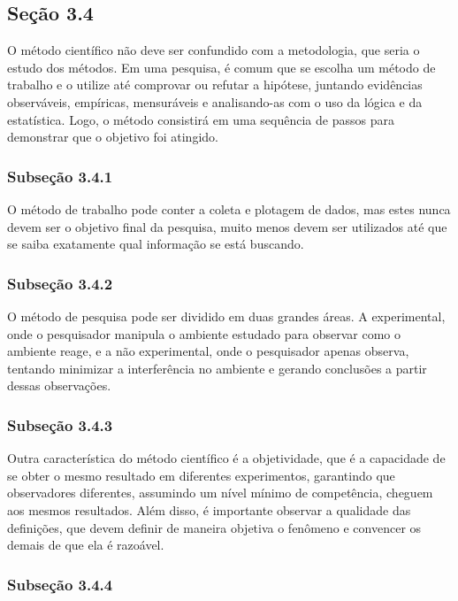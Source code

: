 \documentclass[
	12pt,				%
	openright,			%
	oneside,			%
	a4paper,			%
	chapter=TITLE,		%
	subsection=TITLE,	%
	english,			%
	brazilian,				%
	]{abntex2}
\begin{document}
\subsection*{Seção 3.4}

O método científico não deve ser confundido com a metodologia, que seria o estudo dos métodos. Em uma pesquisa, é comum que se escolha um método de trabalho e o utilize até comprovar ou refutar a hipótese, juntando evidências observáveis, empíricas, mensuráveis e analisando-as com o uso da lógica e da estatística. Logo, o método consistirá em uma sequência de passos para demonstrar que o objetivo foi atingido.

\subsubsection*{Subseção 3.4.1}

O método de trabalho pode conter a coleta e plotagem de dados, mas estes nunca devem ser o objetivo final da pesquisa, muito menos devem ser utilizados até que se saiba exatamente qual informação se está buscando.

\subsubsection*{Subseção 3.4.2}

O método de pesquisa pode ser dividido em duas grandes áreas. A experimental, onde o pesquisador manipula o ambiente estudado para observar como o ambiente reage, e a não experimental, onde o pesquisador apenas observa, tentando minimizar a interferência no ambiente e gerando conclusões a partir dessas observações.

\subsubsection*{Subseção 3.4.3}

Outra característica do método científico é a objetividade, que é a capacidade de se obter o mesmo resultado em diferentes experimentos, garantindo que observadores diferentes, assumindo um nível mínimo de competência, cheguem aos mesmos resultados. Além disso, é importante observar a qualidade das definições, que devem definir de maneira objetiva o fenômeno e convencer os demais de que ela é razoável.

\subsubsection*{Subseção 3.4.4}
\end{document}
